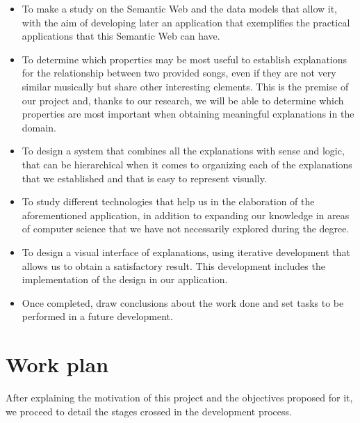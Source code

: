 \begin{itemize}
\item To make a study on the Semantic Web and the data models that allow it, with the aim of developing later an application that exemplifies the practical applications that this Semantic Web can have.\\

\item To determine which properties may be most useful to establish explanations for the relationship between two provided songs, even if they are not very similar musically but share other interesting elements. This is the premise of our project and, thanks to our research, we will be able to determine which properties are most important when obtaining meaningful explanations in the domain.\\

\item To design a system that combines all the explanations with sense and logic, that can be hierarchical when it comes to organizing each of the explanations that we established and that is easy to represent visually.\\

\item To study different technologies that help us in the elaboration of the aforementioned application, in addition to expanding our knowledge in areas of computer science that we have not necessarily explored during the degree.\\

\item To design a visual interface of explanations, using iterative development that allows us to obtain a satisfactory result. This development includes the implementation of the design in our application.\\

\item Once completed, draw conclusions about the work done and set tasks to be performed in a future development.\\
\end{itemize}

\section{Work plan}

After explaining the motivation of this project and the objectives proposed for it, we proceed to detail the stages crossed in the development process.\\


